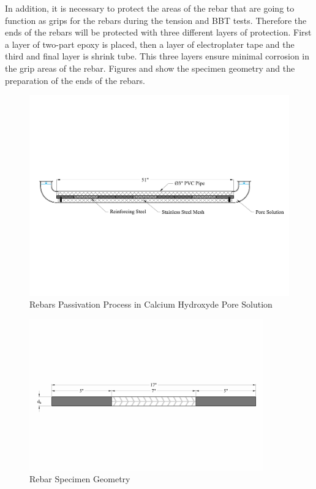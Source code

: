 In addition, it is necessary to protect the areas of the rebar that are going to function as grips for the rebars during the tension and BBT tests. Therefore the ends of the rebars will be protected with three different layers of protection. First a layer of two-part epoxy is placed, then a layer of electroplater tape and the third and final layer is shrink tube. This three layers ensure minimal corrosion in the grip areas of the rebar. Figures  and  show the specimen geometry and the preparation of the ends of the rebars.
\begin{figure}[htbp]
	\centering
	\includegraphics[width=1.0\textwidth]{Chapter-3/figs/AnodicPolarization_01}
	\caption{Rebars Passivation Process in Calcium Hydroxyde Pore Solution}
	\label{fig:RebarPassivation}
\end{figure}
\begin{figure}[htbp]
	\centering
	\includegraphics[width=0.9\textwidth]{Chapter-3/figs/RebarSamples}
	\caption{Rebar Specimen Geometry}
	\label{fig:RebarSpecimenGeomtry}
\end{figure}

